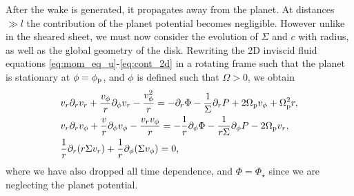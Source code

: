 After the wake is generated, it propagates away from the planet.
At distances $\gg l$ the contribution of the planet potential becomes negligible.
However unlike in the sheared sheet, we must now consider the evolution of $\Sigma$ and $c$ with radius, as well as the global geometry of the disk.
Rewriting the 2D inviscid fluid equations \ref{eq:mom_eq_u}-\ref{eq:cont_2d} in a rotating frame such that the planet is stationary at $\phi=\phi_{\rm p}$, and $\phi$ is defined such that $\Omega>0$, we obtain \citep{landau1959}
\begin{align}
    &v_r \partial_r v_r + \frac{v_\phi}{r} \partial_\phi v_r - \frac{v_\phi^2}{r} = - \partial_r \Phi - \frac{1}{\Sigma} \partial_r P + 2 \Omega_{\rm p} v_\phi + \Omega_{\rm p}^2 r, \label{eq:mom_eq_u_pl} \\ 
    &v_r \partial_r v_\phi + \frac{v}{r} \partial_\phi v_\phi - \frac{v_r v_\phi}{r} = - \frac{1}{r} \partial_\phi \Phi - \frac{1}{r\Sigma} \partial_\phi P - 2 \Omega_{\rm p} v_r, \label{eq:mom_eq_v_pl} \\
    &\frac{1}{r} \partial_r (r \Sigma v_r) + \frac{1}{r} \partial_\phi (\Sigma v_\phi) = 0,
    \label{eq:cont_2d_pl}
\end{align}
where we have also dropped all time dependence, and $\Phi=\Phi_\star$ since we are neglecting the planet potential.

